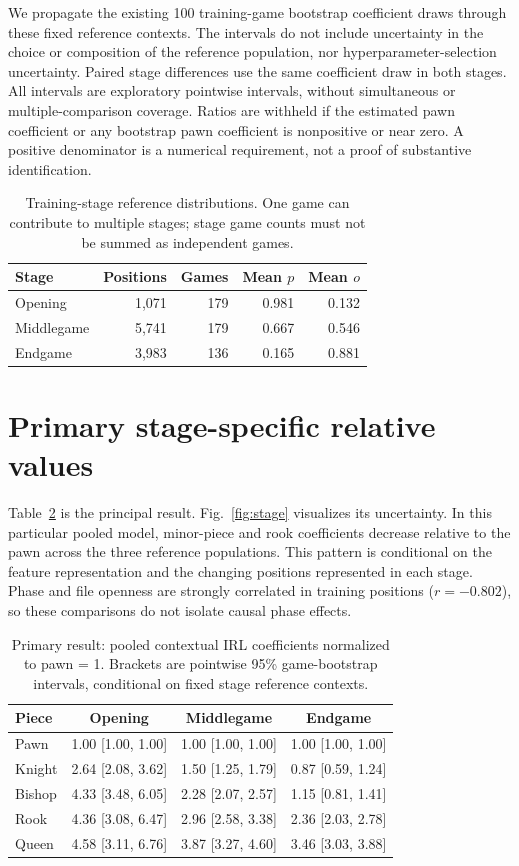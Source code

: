 \documentclass{jcst}
\begin{document}
We propagate the existing 100 training-game bootstrap coefficient draws through these fixed reference contexts. The intervals do not include uncertainty in the choice or composition of the reference population, nor hyperparameter-selection uncertainty. Paired stage differences use the same coefficient draw in both stages. All intervals are exploratory pointwise intervals, without simultaneous or multiple-comparison coverage. Ratios are withheld if the estimated pawn coefficient or any bootstrap pawn coefficient is nonpositive or near zero. A positive denominator is a numerical requirement, not a proof of substantive identification.
\begin{table}[tbp]\centering
\small
\caption{Training-stage reference distributions. One game can contribute to multiple stages; stage game counts must not be summed as independent games.}\label{tab:coverage}
\begin{tabular}{lrrrr}
\toprule
Stage & Positions & Games & Mean $p$ & Mean $o$\\\midrule
Opening & 1,071 & 179 & 0.981 & 0.132\\
Middlegame & 5,741 & 179 & 0.667 & 0.546\\
Endgame & 3,983 & 136 & 0.165 & 0.881\\
\bottomrule\end{tabular}\end{table}


\section{Primary stage-specific relative values}
Table~\ref{tab:primary} is the principal result. Fig.~\ref{fig:stage} visualizes its uncertainty. In this particular pooled model, minor-piece and rook coefficients decrease relative to the pawn across the three reference populations. This pattern is conditional on the feature representation and the changing positions represented in each stage. Phase and file openness are strongly correlated in training positions ($r=-0.802$), so these comparisons do not isolate causal phase effects.
\begin{table}[t]\centering
\small
\caption{Primary result: pooled contextual IRL coefficients normalized to pawn = 1. Brackets are pointwise 95\% game-bootstrap intervals, conditional on fixed stage reference contexts.}\label{tab:primary}
\begin{tabular}{lccc}
\toprule
Piece & Opening & Middlegame & Endgame\\\midrule
Pawn & 1.00 [1.00, 1.00] & 1.00 [1.00, 1.00] & 1.00 [1.00, 1.00]\\
Knight & 2.64 [2.08, 3.62] & 1.50 [1.25, 1.79] & 0.87 [0.59, 1.24]\\
Bishop & 4.33 [3.48, 6.05] & 2.28 [2.07, 2.57] & 1.15 [0.81, 1.41]\\
Rook & 4.36 [3.08, 6.47] & 2.96 [2.58, 3.38] & 2.36 [2.03, 2.78]\\
Queen & 4.58 [3.11, 6.76] & 3.87 [3.27, 4.60] & 3.46 [3.03, 3.88]\\
\bottomrule\end{tabular}\end{table}
\end{document}
